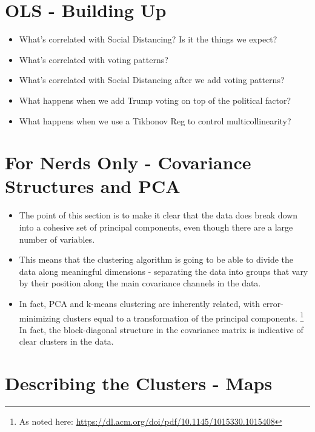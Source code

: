 \documentclass{article}
\begin{document}
\section{OLS - Building Up}

\begin{itemize}
	\item What's correlated with Social Distancing? Is it the things we expect?
	\item What's correlated with voting patterns?
	\item What's correlated with Social Distancing after we add voting patterns?
	\item What happens when we add Trump voting on top of the political factor?
	\item What happens when we use a Tikhonov Reg to control multicollinearity?
\end{itemize}

\section{For Nerds Only - Covariance Structures and PCA}

\begin{itemize}
	\item The point of this section is to make it clear that the data does break down into a cohesive set of principal components, even though there are a large number of variables. 
	\item This means that the clustering algorithm is going to be able to divide the data along meaningful dimensions - separating the data into groups that vary by their position along the main covariance channels in the data. 
	\item In fact, PCA and k-means clustering are inherently related, with error-minimizing clusters equal to a transformation of the principal components. \footnote{As noted here: \url{https://dl.acm.org/doi/pdf/10.1145/1015330.1015408}} In fact, the block-diagonal structure in the covariance matrix is indicative of clear clusters in the data. 
\end{itemize}

\section{Describing the Clusters - Maps}
\end{document}
